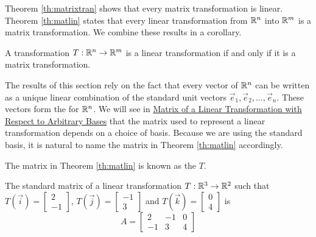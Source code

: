 \documentclass{ximera}
\begin{document}
Theorem \ref{th:matrixtran} shows that every matrix transformation is linear.  Theorem \ref{th:matlin} states that every linear transformation from $\mathbb{R}^n$ into $\mathbb{R}^m$ is a matrix transformation.  We combine these results in a corollary.

  \begin{corollary}\label{cor:lintransmattrans} A transformation $T:\mathbb{R}^n\rightarrow\mathbb{R}^m$ is a linear transformation if and only if it is a matrix transformation.
\end{corollary}  

The results of this section rely on the fact that every vector of $\mathbb{R}^n$ can be written as a unique linear combination of the standard unit vectors $\vec{e}_1,\vec{e}_2,\dots,\vec{e}_n$.  These vectors form the  for $\mathbb{R}^n$.  We will see in \href{https://ximera.osu.edu/linearalgebradzv3/LinearAlgebraInteractiveIntro/LTR-0080/main}{Matrix of a Linear Transformation with Respect to Arbitrary Bases} that the matrix used to represent a linear transformation depends on a choice of basis.  Because we are using the standard basis, it is natural to name the matrix in Theorem \ref{th:matlin} accordingly.

\begin{definition} \label{def:standardmatoflintrans}
  
The matrix in Theorem \ref{th:matlin} is known as the  $T$.
  
\end{definition}





 \begin{example}\label{ex:findmatrix2}
 The standard matrix of a linear transformation $T:\mathbb{R}^3\rightarrow \mathbb{R}^2$ such that $T(\vec{i})=\begin{bmatrix}2\\-1\end{bmatrix}$, $T(\vec{j})=\begin{bmatrix}-1\\3\end{bmatrix}$ and $T(\vec{k})=\begin{bmatrix}0\\4\end{bmatrix}$ is
 $$A=\begin{bmatrix}2&-1&0\\-1&3&4\end{bmatrix}$$
 \end{example}
 
\end{document}

